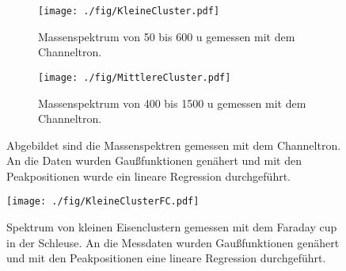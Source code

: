 
\begin{figure}
  \begin{subfigure}[h]{1\textwidth}
    \texttt{[image: ./fig/KleineCluster.pdf]}
    \caption{Massenspektrum von 50 bis 600 u gemessen mit dem Channeltron.}
    \label{fig:cluster_small}
  \end{subfigure}\hfill
  \begin{subfigure}[t]{1\textwidth}
    \texttt{[image: ./fig/MittlereCluster.pdf]}
    \caption{Massenspektrum von 400 bis 1500 u gemessen mit dem Channeltron.}
    \label{fig:cluster_medium}
  \end{subfigure}
  \caption{Abgebildet sind die Massenspektren gemessen mit dem Channeltron. An die Daten wurden Gaußfunktionen genähert und mit den Peakpositionen wurde ein lineare Regression durchgeführt.}
  \label{fig:cluster_chtr}
\end{figure}

\begin{figure}
  \centering
  \texttt{[image: ./fig/KleineClusterFC.pdf]}
  \caption{Spektrum von kleinen Eisenclustern gemessen mit dem Faraday cup in der Schleuse. An die Messdaten wurden Gaußfunktionen genähert und mit den Peakpositionen eine lineare Regression durchgeführt.}
  \label{fig:cluster_fc}
\end{figure}


